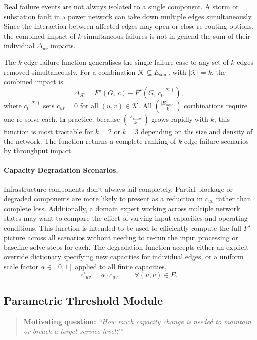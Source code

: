 \documentclass[12pt]{report}
\begin{document}
Real failure events are not always isolated to a single component. A storm or substation fault in a power network can take down multiple edges simultaneously. Since the interaction between affected edges may open or close re-routing options, the combined impact of $k$ simultaneous failures is not in general the sum of their individual $\Delta_{uv}$ impacts.

The $k$-edge failure function generalises the single failure case to any set of $k$ edges removed simultaneously. For a combination $\mathcal{K} \subseteq E_{\text{some}}$ with $|\mathcal{K}| = k$, the combined impact is:
\[
\Delta_{\mathcal{K}} = F^\star(G,\, c) - 
F^\star\!\left(G,\, c^{(\mathcal{K})}_0\right),
\]
where $c^{(\mathcal{K})}_0$ sets $c_{uv} = 0$ for all $(u,v) \in \mathcal{K}$. 
All $\binom{|E_{\text{some}}|}{k}$ combinations require one re-solve each. In practice, because $\binom{|E_{\text{some}}|}{k}$ grows rapidly with $k$, this function is most tractable for $k = 2$ or $k = 3$ depending on the size and density of the network. The function returns a complete ranking of $k$-edge failure scenarios by throughput impact.

\paragraph{Capacity Degradation Scenarios.}
Infrastructure components don't always fail completely. Partial blockage or degraded components are more likely to present as a 
reduction in $c_{uv}$ rather than complete loss. Additionally, a domain expert working across multiple network states may want to compare the effect of varying input capacities and operating conditions. This function is intended to be used to efficiently compute the full $F^\star$ picture across all scenarios  without needing to re-run the input processing or baseline solve steps for each. 
The degradation function accepts either an explicit override dictionary specifying new capacities for individual edges, or a uniform scale factor 
$\alpha \in [0,1]$ applied to all finite capacities,
\[
c'_{uv} = \alpha \cdot c_{uv}, \qquad \forall (u,v) \in E.
\]





\subsection{Parametric Threshold Module}
\begin{quote}
    \textbf{Motivating question:} 
    \textit{``How much capacity change is needed to maintain or breach a target service level?''}
\end{quote}
\end{document}
